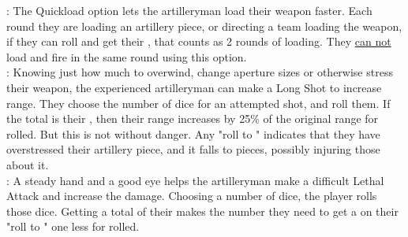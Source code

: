 \begin{multicols*}{2}
{: The Quickload option lets the artilleryman load their weapon faster. Each round they are  loading an artillery piece, or directing a team loading the weapon, if they can roll  and get their , that counts as 2 rounds of loading. They \ul{can not} load and fire in the same round using this option.\\

: Knowing just how much to overwind, change aperture sizes or otherwise stress their weapon, the experienced artilleryman can make a Long Shot to increase range. They choose the number of dice for an attempted shot, and roll them. If the total is their , then their range increases by 25\% of the original range for  rolled. But this is not without danger. Any "roll to "  indicates that they have overstressed their artillery piece, and it falls to pieces, possibly injuring those about it.\\

: A steady hand and a good eye helps the artilleryman make a difficult Lethal Attack and increase the damage. Choosing a number of dice, the player rolls those dice. Getting a total of their  makes the number they need to get a  on their "roll to " one less for  rolled. \\

}
\end{multicols*}
